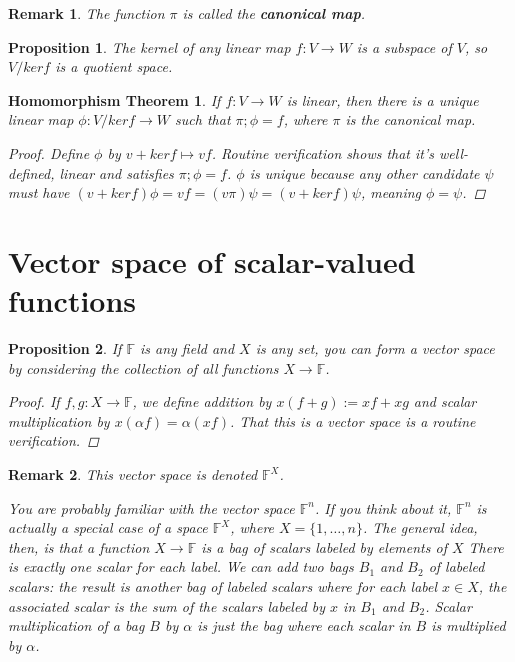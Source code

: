 \documentclass[a4paper,14pt]{article}
\newtheorem*{prop}{Proposition}
\newtheorem*{remark}{Remark}
\newtheorem*{homomorphism-thm}{Homomorphism Theorem}
\begin{document}
\begin{remark}
The function $\pi$ is called the \textbf{canonical map}.
\end{remark}

\begin{prop}
The kernel of any linear map $f: V \to W$ is a subspace of $V$, so $V / ker f$ is a quotient space.
\end{prop}

\begin{homomorphism-thm}
If $f: V \to W$ is linear, then there is a unique linear map $\phi: V / ker f \to W$ such that $\pi ; \phi = f$, where $\pi$ is the canonical map.

\begin{proof}
    Define $\phi$ by $v + ker f \mapsto vf$. Routine verification shows that it's well-defined, linear and satisfies $\pi ; \phi = f$. $\phi$ is unique because any other candidate $\psi$ must have $(v + ker f)\phi = vf = (v \pi) \psi = (v + ker f) \psi$, meaning $\phi = \psi$.
\end{proof}
\end{homomorphism-thm}
\section{Vector space of scalar-valued functions}
\begin{prop}
If $\mathbb{F}$ is any field and $X$ is any set, you can form a vector space by considering the collection of all functions $X \to \mathbb{F}$. 

\begin{proof}
If $f, g: X \to \mathbb{F}$, we define addition by $x(f + g) := xf + xg$ and scalar multiplication by $x(\alpha f) = \alpha (x f)$. That this is a vector space is a routine verification.
\end{proof}
\end{prop}

\begin{remark}
This vector space is denoted $\mathbb{F}^X$.

You are probably familiar with the vector space $\mathbb{F}^n$. If you think about it, $\mathbb{F}^n$ is actually a special case of a space $\mathbb{F}^X$, where $X = \{1, \ldots, n\}$. The general idea, then, is that a function $X \to \mathbb{F}$ is a bag of scalars labeled by elements of $X$ There is exactly one scalar for each label. We can add two bags $B_1$ and $B_2$ of labeled scalars: the result is another bag of labeled scalars where for each label $x \in X$, the associated scalar is the sum of the scalars labeled by $x$ in $B_1$ and $B_2$. Scalar multiplication of a bag $B$ by $\alpha$ is just the bag where each scalar in $B$ is multiplied by $\alpha$.
\end{remark}
\end{document}
